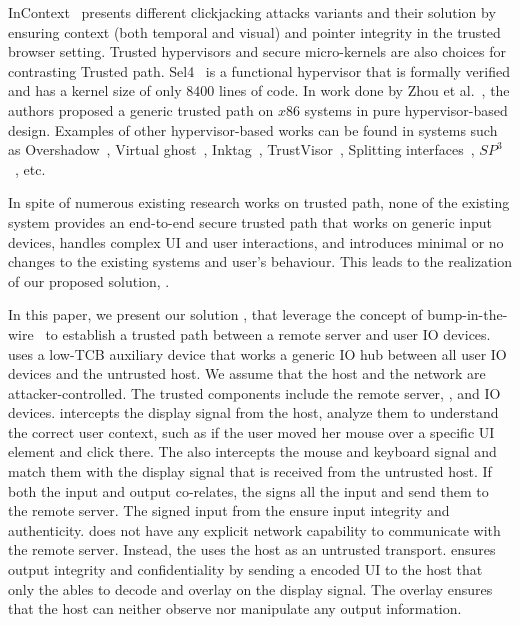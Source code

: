 InContext~\cite{huang2012clickjacking} presents different clickjacking attacks variants and their solution by ensuring context (both temporal and visual) and pointer integrity in the trusted browser setting. Trusted hypervisors and secure micro-kernels are also choices for contrasting Trusted path. Sel4~\cite{klein2009sel4} is a functional hypervisor that is formally verified and has a kernel size of only $8400$ lines of code. In work done by Zhou et al.~\cite{zhou2012building}, the authors proposed a generic trusted path on $x86$ systems in pure hypervisor-based design. Examples of other hypervisor-based works can be found in systems such as Overshadow~\cite{Overshadow}, Virtual ghost~\cite{criswell2014virtual}, Inktag~\cite{hofmann2013inktag}, TrustVisor~\cite{mccune2010trustvisor}, Splitting interfaces~\cite{ta2006splitting}, $SP^3$~\cite{yang2008using}, etc.

In spite of numerous existing research works on trusted path, none of the existing system provides an end-to-end secure trusted path that works on generic input devices, handles complex UI and user interactions, and introduces minimal or no changes to the existing systems and user's behaviour. This leads to the realization of our proposed solution, \name.

 In this paper, we present our solution \name, that leverage the concept of bump-in-the-wire~\cite{McCPerRei2006} to establish a trusted path between a remote server and user IO devices. \name uses a low-TCB auxiliary device that works a generic IO hub between all user IO devices and the untrusted host. 
We assume that the host and the network are attacker-controlled. The trusted components include the remote server, \device, and IO devices. \device intercepts the display signal from the host, analyze them to understand the correct user context, such as if the user moved her mouse over a specific UI element and click there. The \device also intercepts the mouse and keyboard signal and match them with the display signal that is received from the untrusted host. If both the input and output co-relates, the \device signs all the input and send them to the remote server. The signed input from the \device ensure input integrity and authenticity. \device does not have any explicit network capability to communicate with the remote server. Instead, the \device uses the host as an untrusted transport. \device ensures output integrity and confidentiality by sending a encoded UI to the host that only the \device ables to decode and overlay on the display signal. The overlay ensures that the host can neither observe nor manipulate any output information. 



